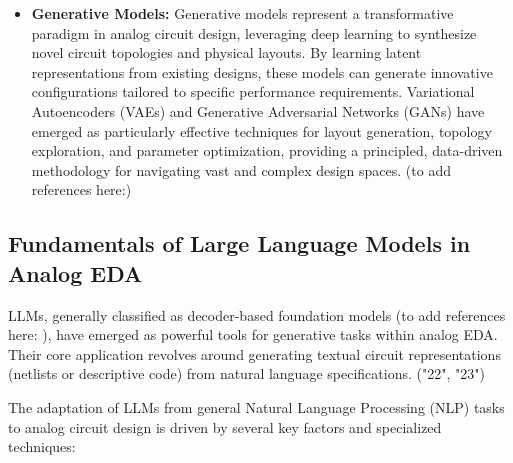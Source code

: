 \documentclass{ieeeaccess}
\begin{document}
\begin{itemize}
	\item \textbf{Generative Models:} Generative models represent a transformative paradigm in analog circuit design, leveraging deep learning to synthesize novel circuit topologies and physical layouts. By learning latent representations from existing designs, these models can generate innovative configurations tailored to specific performance requirements. Variational Autoencoders (VAEs) and Generative Adversarial Networks (GANs) have emerged as particularly effective techniques for layout generation, topology exploration, and parameter optimization, providing a principled, data-driven methodology for navigating vast and complex design spaces. (to add references here:)

\end{itemize}

\subsection{Fundamentals of Large Language Models in Analog EDA}

LLMs, generally classified as decoder-based foundation models (to add
references here: ), have emerged as powerful tools for generative tasks within
analog EDA. Their core application revolves around generating textual circuit
representations (netlists or descriptive code) from natural language
specifications. ("22", "23") \newline

\noindent The adaptation of LLMs from general Natural Language Processing (NLP) tasks to analog circuit design is driven by several key factors and specialized techniques:
\end{document}
